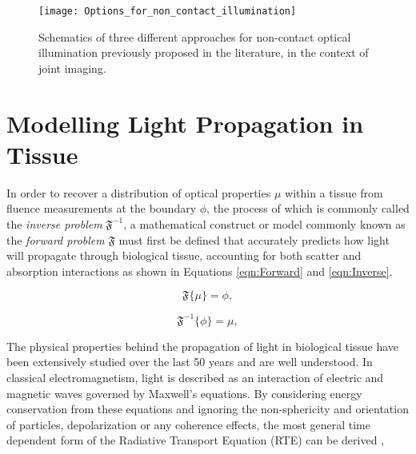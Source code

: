 \documentclass[twoside]{bhamthesis}
\theoremstyle{definition}
\begin{document}
\begin{figure}[!ht]
\centering
  \texttt{[image: Options\_for\_non\_contact\_illumination]}
  \caption{Schematics of three different approaches for non-contact optical illumination previously proposed in the literature, in the context of joint imaging.}
\label{fig:Non_contact_approaches}
\end{figure}

\section{Modelling Light Propagation in Tissue}

In order to recover a distribution of optical properties $\mu$ within a tissue from fluence measurements at the boundary $\phi$, the process of which is commonly called the \textit{inverse problem} $\mathfrak{F}^{-1}$, a mathematical construct or model commonly known as the \textit{forward problem} $\mathfrak{F}$ must first be defined that accurately predicts how light will propagate through biological tissue, accounting for both scatter and absorption interactions as shown in Equations \ref{eqn:Forward} and \ref{eqn:Inverse}. 

\begin{figure}[!ht]
	\begin{minipage}{.5\textwidth}
   \begin{equation}
\mathfrak{F} \lbrace \mu \rbrace = \phi,
  	\label{eqn:Forward}
    \end{equation} 
  \end{minipage}%
  \begin{minipage}{.5\textwidth}
    \begin{equation}
	\mathfrak{F}^{-1} \lbrace \phi \rbrace = \mu,
  	\label{eqn:Inverse}
    \end{equation}
  \end{minipage}
\end{figure}

The physical properties behind the propagation of light in biological tissue have been extensively studied over the last 50 years and are well understood. In classical electromagnetism, light is described as an interaction of electric and magnetic waves governed by Maxwell's equations.  By considering energy conservation from these equations and ignoring the non-sphericity and orientation of particles, depolarization or any coherence effects, the most general time dependent form of the Radiative Transport Equation (RTE) can be derived \cite{ripoll2011derivation},
\end{document}
